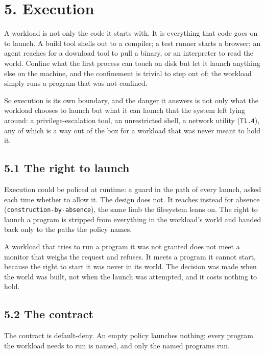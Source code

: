 \hypertarget{execution}{%
\chapter{5. Execution}\label{execution}}

A workload is not only the code it starts with. It is everything that
code goes on to launch. A build tool shells out to a compiler; a test
runner starts a browser; an agent reaches for a download tool to pull a
binary, or an interpreter to read the world. Confine what the first
process can touch on disk but let it launch anything else on the
machine, and the confinement is trivial to step out of: the workload
simply runs a program that was not confined.

So execution is its own boundary, and the danger it answers is not only
what the workload chooses to launch but what it can launch that the
system left lying around: a privilege-escalation tool, an unrestricted
shell, a network utility (\texttt{T1.4}), any of which is a way out of
the box for a workload that was never meant to hold it.

\hypertarget{the-right-to-launch}{%
\section{5.1 The right to launch}\label{the-right-to-launch}}

Execution could be policed at runtime: a guard in the path of every
launch, asked each time whether to allow it. The design does not. It
reaches instead for absence (\texttt{construction-by-absence}), the same
limb the filesystem leans on. The right to launch a program is stripped
from everything in the workload's world and handed back only to the
paths the policy names.

A workload that tries to run a program it was not granted does not meet
a monitor that weighs the request and refuses. It meets a program it
cannot start, because the right to start it was never in its world. The
decision was made when the world was built, not when the launch was
attempted, and it costs nothing to hold.

\hypertarget{the-contract}{%
\section{5.2 The contract}\label{the-contract}}

The contract is default-deny. An empty policy launches nothing; every
program the workload needs to run is named, and only the named programs
run.

